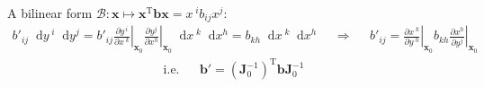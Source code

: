 \documentclass{article}
\theoremstyle{plain}
\theoremstyle{definition}
\newcommand\dif{\mathop{}\!\mathrm{d}}
\newcommand*{\bv}{\boldsymbol}
\newcommand*{\bm}{\boldsymbol}
\begin{document}
A bilinear form $\mathscr{B}: \bv x \mapsto \bv x^{\mathrm{T}} \bm b \bv x = x^{\;i}b_{ij}x^j$: 
\begin{align*}
	b'_{ij}\dif y^{\;i} \dif y^j 
	= b'_{ij} \left.\frac{\partial y^{\,i}}{\partial x^{\;k}}\right|_{\bv x_0}
	\left.\frac{\partial y^j}{\partial x^h}\right|_{\bv x_0}\dif x^{\;k}\dif x^h 
	=b_{kh} \dif x^{\;k}\dif x^h 
	&&\Rightarrow&&
	b'_{ij} =\left. \frac{\partial x^{\;k}}{\partial y^{\;h}}\right|_{\bv x_0}
	b_{kh} 
	\left.\frac{\partial x^h}{\partial y^j}\right|_{\bv x_0}
\end{align*}
\begin{align}\label{bilinear form}
	\text{i.e.} &&
	\bm b' = (\bm J^{-1}_0)^{\mathrm{T}} \bm b \bm J^{-1}_0
\end{align}
\printindex
\end{document}
